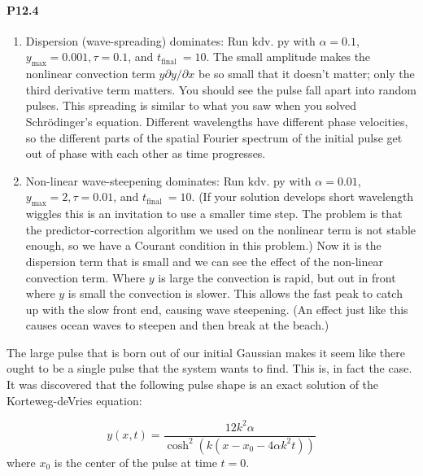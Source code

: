 \paragraph*{P12.4}
\begin{enumerate}[label=(\alph*)]
\item Dispersion (wave-spreading) dominates: Run $\mathrm{kdv}$. py with $\alpha=0.1$, $y_{\max }=0.001, \tau=0.1$, and $t_{\text {final }}=10$. The small amplitude makes the nonlinear convection term $y \partial y / \partial x$ be so small that it doesn't matter; only the third derivative term matters. You should see the pulse fall apart into random pulses. This spreading is similar to what you saw when you solved Schrödinger's equation. Different wavelengths have different phase velocities, so the different parts of the spatial Fourier spectrum of the initial pulse get out of phase with each other as time progresses.
\item Non-linear wave-steepening dominates: Run $\mathrm{kdv}$. py with $\alpha=0.01$, $y_{\max }=2, \tau=0.01$, and $t_{\text {final }}=10$. (If your solution develops short wavelength wiggles this is an invitation to use a smaller time step. The problem is that the predictor-correction algorithm we used on the nonlinear term is not stable enough, so we have a Courant condition in this problem.)
Now it is the dispersion term that is small and we can see the effect of the non-linear convection term. Where $y$ is large the convection is rapid, but out in front where $y$ is small the convection is slower. This allows the fast peak to catch up with the slow front end, causing wave steepening. (An effect just like this causes ocean waves to steepen and then break at the beach.)
\end{enumerate}
The large pulse that is born out of our initial Gaussian makes it seem like
there ought to be a single pulse that the system wants to find. This is, in fact the
case. It was discovered that the following pulse shape is an exact solution of the
Korteweg-deVries equation:


\begin{equation}\label{eq:1214}
y(x, t)=\frac{12 k^{2} \alpha}{\cosh ^{2}\left(k\left(x-x_{0}-4 \alpha k^{2} t\right)\right)}
\end{equation}
where $x_0$ is the center of the pulse at time $t = 0$.
